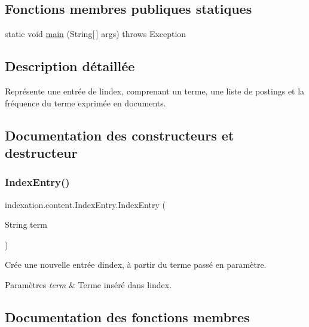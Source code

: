 \subsection*{Fonctions membres publiques statiques}
\begin{DoxyCompactItemize}
\item 
static void \hyperlink{classindexation_1_1content_1_1IndexEntry_a9f8de2f0eb50d5f6480bf4acdb579b29}{main} (String\mbox{[}$\,$\mbox{]} args)  throws Exception  	
\end{DoxyCompactItemize}


\subsection{Description détaillée}
Représente une entrée de l\textquotesingle{}index, comprenant un terme, une liste de postings et la fréquence du terme exprimée en documents. 

\subsection{Documentation des constructeurs et destructeur}
\mbox{\label{classindexation_1_1content_1_1IndexEntry_ae3c75a7b7264b700a79865a3faa530d1}} 
\subsubsection{\texorpdfstring{Index\+Entry()}{IndexEntry()}}
{\footnotesize\ttfamily indexation.\+content.\+Index\+Entry.\+Index\+Entry (\begin{DoxyParamCaption}\item[{String}]{term }\end{DoxyParamCaption})}

Crée une nouvelle entrée d\textquotesingle{}index, à partir du terme passé en paramètre.


\begin{DoxyParams}{Paramètres}
{\em term} & Terme inséré dans l\textquotesingle{}index. \\
\hline
\end{DoxyParams}


\subsection{Documentation des fonctions membres}
\mbox{\label{classindexation_1_1content_1_1IndexEntry_a91dd96b253668c16155fa48e8a040eed}} 
